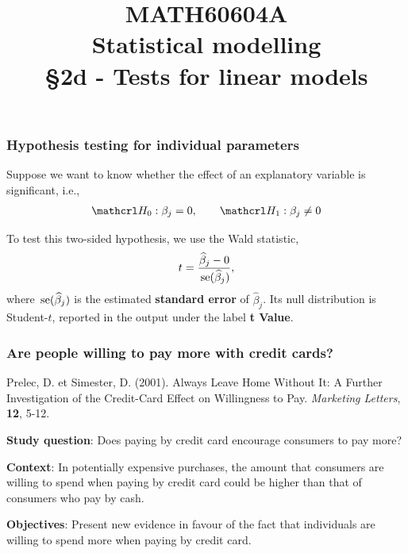 \documentclass{beamer}
\title[\color{white}{MATH60604A Tests for linear models}]{\texorpdfstring{MATH60604A \\Statistical modelling \\ \S 2d - Tests for linear models}{MATH60604A \\Statistical modelling \\ \S~2d - Tests for linear models}}
\author{}
\institute{HEC Montréal\\
Department of Decision Sciences}
\date{}
\begin{document}
\frame{\titlepage}


 \begin{frame}
\frametitle{Hypothesis testing for individual parameters}
\bi
\item Suppose we want to know whether the effect of an explanatory variable is significant, i.e.,
\begin{align*}
\Hy_0: \beta_j=0,  \qquad  \Hy_1: \beta_j\neq 0
\end{align*}
\item To test this two-sided hypothesis, we use the Wald statistic,
\begin{align*}
t=\frac{\widehat{\beta}_j-0}{\,\mathrm{se}(\widehat{\beta}_j)}, 
\end{align*}
where $\,\mathrm{se}(\widehat{\beta}_j)$ is the estimated \textbf{standard error} of $\widehat{\beta}_j$. Its null distribution is Student-$t$, reported in the \SASlang output under the label \textbf{t Value}.
\ei
\end{frame}


\begin{frame}
\frametitle{Are people willing to pay more with credit cards?}

\begin{tcolorbox}[colback=lightgray!30!white,colframe=lightgray!75!black,title=Reference]
Prelec, D. et Simester, D. (2001). Always Leave Home Without It: A Further Investigation of the Credit-Card Effect on Willingness to Pay. \textit{Marketing Letters}, \textbf{12}, 5-12.
\end{tcolorbox}
\bi
\item \alert{\textbf{Study question}}: Does paying by credit card encourage consumers to pay more?
\item \textbf{Context}: In potentially expensive purchases, the amount that consumers are willing to spend when paying by credit card could be higher than that of consumers who pay by cash.
\item \textbf{Objectives}:  Present new evidence in favour of the fact that individuals are willing to spend more when paying by credit card. 
\ei
\end{frame}
\end{document}
